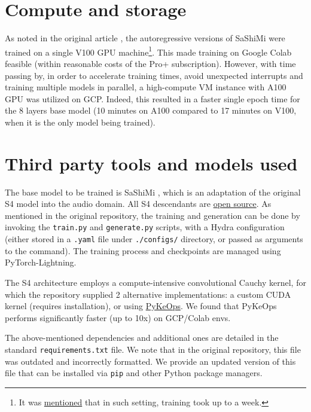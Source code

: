 \documentclass[12pt]{article}
\begin{document}
\section{Compute and storage}\label{marker}
As noted in the original article \cite{goel2022itsrawaudiogeneration}, the autoregressive versions of SaShiMi were trained on a single V100 GPU machine\footnote[1]{It was \href{https://github.com/state-spaces/s4/blob/main/models/sashimi/README.md}{mentioned} that in such setting, training took up to a week.}. This made training on Google Colab feasible (within reasonable costs of the Pro+ subscription). However, with time passing by, in order to accelerate training times, avoid unexpected interrupts and training multiple models in parallel, a high-compute VM instance with A100 GPU was utilized on GCP. Indeed, this resulted in a faster single epoch time for the 8 layers base model (10 minutes on A100 compared to 17 minutes on V100, when it is the only model being trained).

\section{Third party tools and models used}

The base model to be trained is SaShiMi \cite{goel2022itsrawaudiogeneration}, which is an adaptation of the original S4 model \cite{gu2022efficientlymodelinglongsequences} into the audio domain. 
All S4 descendants are \href{https://github.com/state-spaces/s4/tree/main}{open source}. As mentioned in the original repository, the training and generation can be done by invoking the \texttt{train.py} and \texttt{generate.py} scripts, with a Hydra configuration (either stored in a \texttt{.yaml} file under \texttt{./configs/} directory, or passed as arguments to the command). The training process and checkpoints are managed using PyTorch-Lightning. 

The S4 architecture employs a compute-intensive convolutional Cauchy kernel, for which the repository supplied 2 alternative implementations: a custom CUDA kernel (requires installation), or using \href{https://www.kernel-operations.io/keops/index.html}{PyKeOps}. We found that PyKeOps performs significantly faster (up to 10x) on GCP/Colab envs.

The above-mentioned dependencies and additional ones are detailed in the standard \texttt{requirements.txt} file. We note that  in the original repository, this file was outdated and incorrectly formatted. We provide an updated version of this file that can be installed via \texttt{pip} and other Python package managers.
\end{document}
